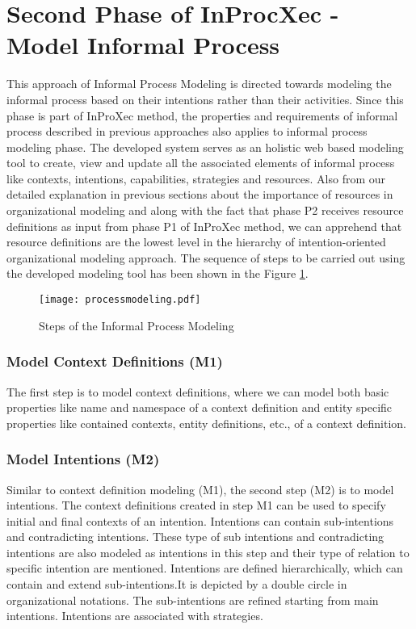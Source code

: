 \section{Second Phase of InProcXec - Model Informal Process}
\label{sec:informalprocessmodeling}
This approach of Informal Process Modeling is directed towards modeling the informal process based on their intentions rather than their activities.  Since this phase is part of InProXec method, the properties and requirements of informal process described in previous approaches \cite{Sungur2014a,Sungur2015} also applies to informal process modeling phase. The developed system serves as an holistic web based modeling tool to create, view and update all the associated elements of informal process like contexts, intentions, capabilities, strategies and resources. Also from our detailed explanation in previous sections about the importance of resources in organizational modeling and along with the fact that phase P2 receives resource definitions as input from phase P1 of InProXec method, we can apprehend that resource definitions are the lowest level in the hierarchy of intention-oriented organizational modeling approach. The sequence of steps to be carried out using the developed modeling tool has been shown in the Figure \ref{fig:processdiagram}. 

\begin{figure}
	\centering
	\texttt{[image: processmodeling.pdf]}
	\caption{Steps of the Informal Process Modeling}
	\label{fig:processdiagram}
\end{figure}

\subsubsection{Model Context Definitions (M1)}  
The first step is to model context definitions, where we can model both basic properties like name and namespace of a context definition and entity specific properties like contained contexts, entity definitions, etc., of a context definition.  

\subsubsection{Model Intentions (M2)}  
Similar to context definition modeling (M1), the second step (M2) is to model intentions. The context definitions created in step M1 can be used to specify initial and final contexts of an intention. Intentions can contain sub-intentions and contradicting intentions. These type of sub intentions and contradicting intentions are also modeled as intentions in this step and their type of relation to specific intention are mentioned. Intentions are defined hierarchically, which can contain and extend sub-intentions.It is depicted by a double circle in organizational notations. The sub-intentions are refined starting from main intentions. Intentions are associated with strategies.

